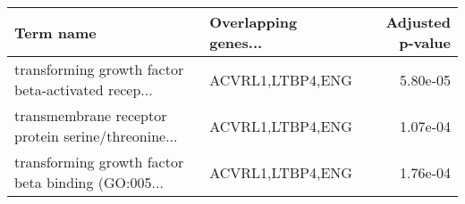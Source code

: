 \begin{tabular}{llr}
\toprule
                                         Term name & Overlapping genes... &  Adjusted p-value \\
\midrule
transforming growth factor beta-activated recep... &     ACVRL1,LTBP4,ENG &          5.80e-05 \\
transmembrane receptor protein serine/threonine... &     ACVRL1,LTBP4,ENG &          1.07e-04 \\
transforming growth factor beta binding (GO:005... &     ACVRL1,LTBP4,ENG &          1.76e-04 \\
\bottomrule
\end{tabular}
